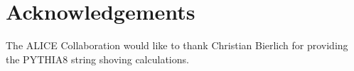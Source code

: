 \documentclass[ALICE,manyauthors]{cernphprep}
\begin{document}
\begin{titlepage}
\begin{abstract}


\end{abstract}

\end{titlepage}

\setcounter{page}{2}






\newenvironment{acknowledgement}{\relax}{\relax}
\begin{acknowledgement}
\section*{Acknowledgements}
\noindent The ALICE Collaboration would like to thank Christian Bierlich for providing the PYTHIA8 string shoving calculations.
\end{acknowledgement}
\end{document}
